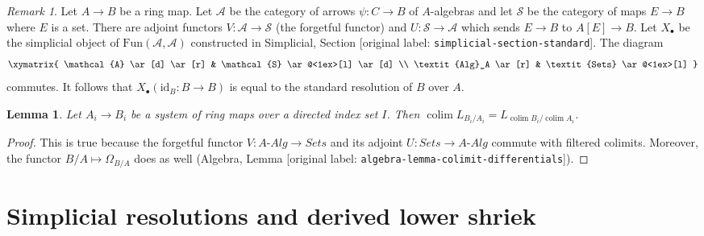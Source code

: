 \documentclass[10pt,a4paper]{article}
\theoremstyle{plain}
\newtheorem{lemma}[subsection]{Lemma}
\theoremstyle{definition}
\theoremstyle{remark}
\newtheorem{remark}[subsection]{Remark}
\numberwithin{equation}{subsection}
\def\colim{\mathop{\mathrm{colim}}\nolimits}
\begin{document}
\begin{remark}
\label{remark-variant-cotangent-complex}
Let $A \to B$ be a ring map. Let $\mathcal{A}$ be the category of
arrows $\psi : C \to B$ of $A$-algebras and let $\mathcal{S}$ be
the category of maps $E \to B$ where $E$ is a set. There are adjoint
functors $V : \mathcal{A} \to \mathcal{S}$ (the forgetful functor)
and $U : \mathcal{S} \to \mathcal{A}$ which sends $E \to B$ to
$A[E] \to B$. Let $X_\bullet$ be the simplicial object of
$\text{Fun}(\mathcal{A}, \mathcal{A})$ constructed in
Simplicial, Section \textnormal{[original label: \nolinkurl{simplicial-section-standard}]}.
The diagram
$$
\xymatrix{
\mathcal{A} \ar[d] \ar[r] & \mathcal{S} \ar@<1ex>[l] \ar[d] \\
\textit{Alg}_A \ar[r] & \textit{Sets} \ar@<1ex>[l]
}
$$
commutes. It follows that $X_\bullet(\text{id}_B : B \to B)$
is equal to the standard resolution of $B$ over $A$.
\end{remark}

\begin{lemma}
\label{lemma-colimit-cotangent-complex}
Let $A_i \to B_i$ be a system of ring maps over a directed index
set $I$. Then $\colim L_{B_i/A_i} = L_{\colim B_i/\colim A_i}$.
\end{lemma}

\begin{proof}
This is true because the forgetful functor
$V : A\textit{-Alg} \to \textit{Sets}$ and its adjoint
$U : \textit{Sets} \to A\textit{-Alg}$ commute with filtered colimits.
Moreover, the functor $B/A \mapsto \Omega_{B/A}$ does as well
(Algebra, Lemma \textnormal{[original label: \nolinkurl{algebra-lemma-colimit-differentials}]}).
\end{proof}





\section{Simplicial resolutions and derived lower shriek}
\label{section-compute-L-pi-shriek}
\end{document}
